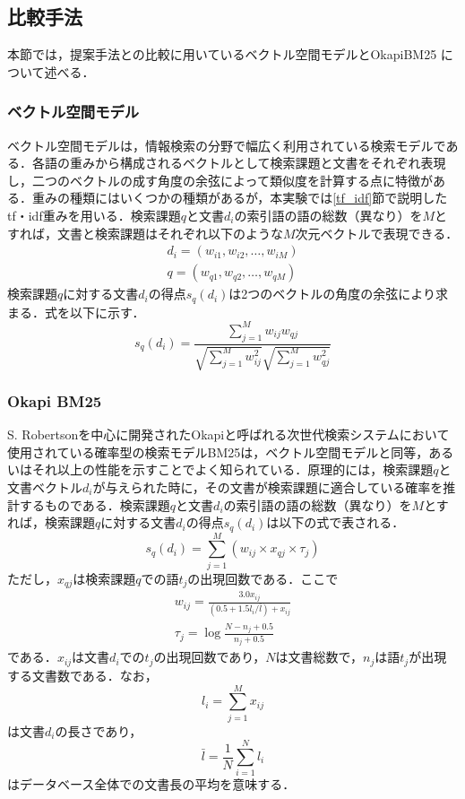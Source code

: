 \documentclass[japanese]{jnlp_1.4}
\begin{document}
\subsection{比較手法}

本節では，提案手法との比較に用いているベクトル空間モデル\cite{Salton:75}とOkapiBM25 \cite{Robertson:95}について述べる．


\subsubsection{ベクトル空間モデル}

ベクトル空間モデルは，情報検索の分野で幅広く利用されている検索モデルである．各語の重みから構成されるベクトルとして検索課題と文書をそれぞれ表現し，二つのベクトルの成す角度の余弦によって類似度を計算する点に特徴がある．重みの種類にはいくつかの種類があるが，本実験では\ref{tf_idf}節で説明したtf・idf重みを用いる．検索課題$q$と文書$d_i$の索引語の語の総数（異なり）を$M$とすれば，文書と検索課題はそれぞれ以下のような$M$次元ベクトルで表現できる．
\begin{gather}
 d_i=(w_{i1},w_{i2},…,w_{iM}) \\
 q=(w_{q1},w_{q2},…,w_{qM})
\end{gather}
検索課題$q$に対する文書$d_i$の得点$s_q(d_i)$は2つのベクトルの角度の余弦により求まる．式を以下に示す．
\begin{equation}
 s_q(d_i)=\frac{\sum_{j=1}^M w_{ij}w_{qj}}{ \sqrt{\sum_{j=1}^M w_{ij}^{2}} \sqrt{\sum_{j=1}^M w_{qj}^{2}} }
\end{equation}


\subsubsection{Okapi BM25}

S. Robertsonを中心に開発されたOkapiと呼ばれる次世代検索システムにおいて使用されている確率型の検索モデルBM25は，ベクトル空間モデルと同等，あるいはそれ以上の性能を示すことでよく知られている．原理的には，検索課題$q$と文書ベクトル$d_i$が与えられた時に，その文書が検索課題に適合している確率を推計するものである．検索課題$q$と文書$d_i$の索引語の語の総数（異なり）を$M$とすれば，検索課題$q$に対する文書$d_i$の得点$s_q(d_i)$は以下の式で表される．
\begin{equation}
 s_q(d_i)=\sum_{j=1}^M(w_{ij}\times x_{qj} \times \tau_j)
\end{equation}
ただし，$x_{qj}$は検索課題$q$での語$t_j$の出現回数である．ここで
\begin{gather}
 w_{ij}=\frac{3.0 x_{ij}}{(0.5+1.5l_i / \bar{l})+x_{ij}} \\
 \tau_j=\log\frac{N-n_j+0.5}{n_j+0.5}
\end{gather}
である．$x_{ij}$は文書$d_i$での$t_j$の出現回数であり，$N$は文書総数で，$n_j$は語$t_j$が出現する文書数である．なお，
\begin{equation}
 l_i=\sum_{j=1}^M{x_{ij}}
\end{equation}
は文書$d_i$の長さであり，
\begin{equation}
 \bar{l}=\frac{1}{N}\sum_{i=1}^N{l_i}
\end{equation}
はデータベース全体での文書長の平均を意味する．
\end{document}
